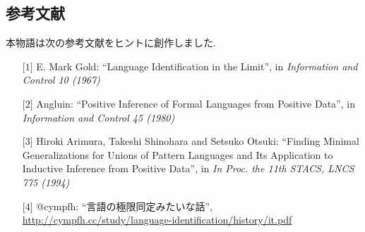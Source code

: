 \subsection*{参考文献}

本物語は次の参考文献をヒントに創作しました.

\begin{enumerate}
    \item[$\lbrack 1 \rbrack$] E. Mark Gold: ``Language Identification in the Limit'', in \emph{Information and Control 10 (1967)}
    \item[$\lbrack 2 \rbrack$] Angluin: ``Positive Inference of Formal Languages from Positive Data'', in \emph{Information and Control 45 (1980)}
    \item[$\lbrack 3 \rbrack$] {Hiroki Arimura, Takeshi Shinohara and Setsuko Otsuki}: ``{Finding Minimal Generalizations for Unions of Pattern Languages and Its Application to Inductive Inference from Positive Data}'', in \emph{In Proc. the 11th STACS, LNCS 775 (1994)}
    \item[$\lbrack 4 \rbrack$] {\rm @cympfh}: ``言語の極限同定みたいな話'',\\
        \url{http://cympfh.cc/study/language-identification/history/it.pdf}
\end{enumerate}
